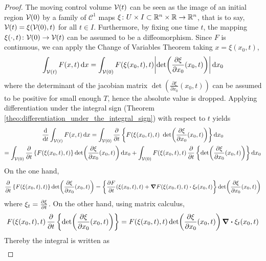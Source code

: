 \begin{proof}
	The moving control volume $\mathcal{V}_{}(t)$ can be seen as the image of an initial
	region $\mathcal{V}_{}(0)$ by a family of $\mathcal{C}^1$ maps $\xi \colon U \times I
	\subset \mathbb{R}^n \times \mathbb{R} \rightarrow \mathbb{R}^n$, that is to say, $\mathcal{V}_{}(t)
	= \xi(\mathcal{V}_{}(0),t)$ for all $t \in I$. Furthermore, by fixing one time $t$,
	the mapping $\xi(\cdot, t) \colon \mathcal{V}_{}(0) \rightarrow \mathcal{V}_{}(t)$ can be
	assumed to be a diffeomorphism. Since $F$ is continuous, we can apply the
	Change of Variables Theorem taking $x = \xi(x_0,t)$,
	\begin{equation*}
		\int_{\mathcal{V}(t)} F(x,t) \dd{x} = 
		\int_{\mathcal{V}_{}(0)} F(\xi(x_0,t), t) \abs{\det(\frac{\partial \xi}{\partial x_0} (x_0, t))} \dd{x_0}
	\end{equation*}
	where the determinant of the jacobian matrix $\det(\frac{\partial
	\xi}{\partial x_0} (x_0, t))$ can be assumed to be positive for
	small enough $T$, hence the absolute value is dropped. Applying
	differentiation under the integral sign (Theorem
	\ref{theo:differentiation_under_the_integral_sign}) with respect to $t$
	yields
	\begin{multline*}
		\frac{\dd}{\dd{t}} \int_{\mathcal{V}(t)} F(x, t) \dd{x} = 
		\int_{\mathcal{V}_{}(0)} \pdv{t} 
		\left\{
		F(\xi(x_0,t), t) \ \det(\frac{\partial \xi}{\partial x_0} (x_0, t))
		\right\}
		\dd{x_0} 
		\\
		= 
		\int_{\mathcal{V}_{}(0)} 
		\pdv{t} \left\{ F(\xi(x_0,t), t) \right\} \det(\frac{\partial \xi}{\partial x_0} (x_0, t)) \dd{x_0} + 
		\int_{\mathcal{V}_{}(0)} F(\xi(x_0,t), t) \, \pdv{t} \left\{ \det(\frac{\partial \xi}{\partial x_0} (x_0, t)) \right\} \dd{x_0}
	\end{multline*}
	On the one hand,
	\begin{equation*}
		\pdv{t} \left\{ F(\xi(x_0,t), t) \right\} \det(\frac{\partial \xi}{\partial x_0} (x_0, t)) = 
		\left\{ 
		\frac{\partial F}{\partial t} (\xi(x_0, t), t) + 
		\grad{F(\xi(x_0, t), t)} \vdot \xi_t (x_0, t)
		\right\}
		\det(\frac{\partial \xi}{\partial x_0} (x_0, t))
	\end{equation*}
	where $\xi_t = \pdv{\xi}{t}$. On the other hand, using matrix calculus,
	\begin{equation*}
		F(\xi(x_0,t), t) \, \pdv{t} \left\{ \det(\frac{\partial \xi}{\partial x_0} (x_0, t)) \right\} = 
		F(\xi(x_0,t), t) \det(\frac{\partial \xi}{\partial x_0} (x_0, t)) \, \div{\xi_t(x_0,t)}
	\end{equation*}
	Thereby the integral is written as
	\begin{multline*}

\end{multline*}
\end{proof}
